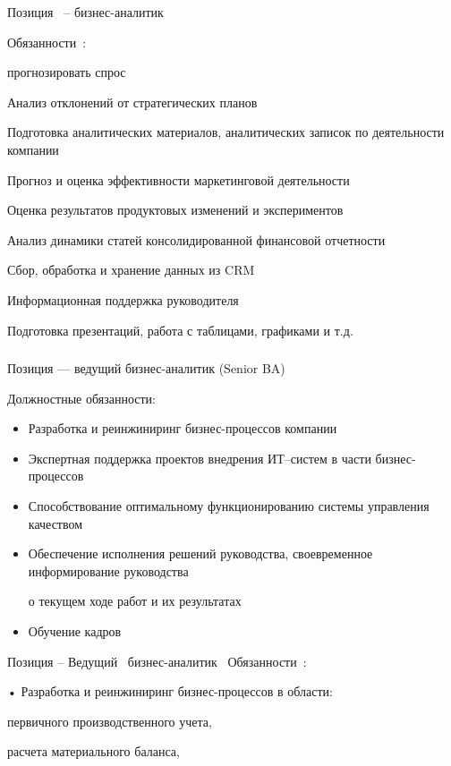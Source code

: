 \documentclass{../industrial-development}
\begin{document}
\lecturenotes

Позиция~\cite{hh} –  бизнес-аналитик~\cite{itcf}

Обязанности~\cite{rab}:

	прогнозировать спрос 

Анализ отклонений от стратегических планов

Подготовка аналитических материалов, аналитических записок по деятельности компании

Прогноз и оценка эффективности маркетинговой деятельности

Оценка результатов продуктовых изменений и экспериментов

Анализ динамики статей консолидированной финансовой отчетности

Сбор, обработка и хранение данных из CRM

Информационная поддержка руководителя

Подготовка презентаций, работа с таблицами, графиками и т.д.


\begin{frame} \frametitle{}
  \begin{block}{}
  \alert{Позиция --- ведущий бизнес-аналитик (Senior  BA) }

Должностные обязанности: 
  \end{block}
  \begin{itemize}
  \item  Разработка и реинжиниринг бизнес-процессов компании
  \item Экспертная поддержка проектов внедрения ИТ--систем в части бизнес-процессов
  \item Способствование оптимальному функционированию системы управления качеством
  \item Обеспечение исполнения решений руководства, своевременное информирование руководства 

о текущем ходе работ и их результатах
 \item  Обучение кадров
  \end{itemize}
\end{frame}



\lecturenotes
Позиция – Ведущий~\cite{hh} бизнес-аналитик~\cite{itcf}
Обязанности~\cite{rab}:

•	Разработка и реинжиниринг бизнес-процессов в области:

первичного производственного учета,

расчета материального баланса,
\end{document}

